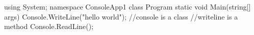 using System;
namespace ConsoleApp1
{
    class Program
    {
        static void Main(string[] args)
        {
            Console.WriteLine("hello world");
            //console is a class
            //writeline is a method
            Console.ReadLine();
        }
    }
}
